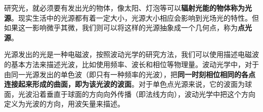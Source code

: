 
研究光，就必须要有发出光的物体，像太阳、灯泡等可以\textbf{辐射光能的物体称为光源}。现实生活中的光源都有着一定大小，光源大小相应会影响到光场光的特性。但如果这一影响微乎其微，我们则可以将这样的光源抽象成一个几何点，称为\textbf{点光源}。

光源发出的光是一种电磁波，按照波动光学的研究方法，我们可以使用描述电磁波的基本方法来描述光波，比如使用频率、波长和相位等物理量。波动光学中，对于由同一光源发出的单色波（即只有一种频率的光波），把\textbf{同一时刻相位相同的各点连接起来形成的曲面，即为该光波的波面}。对于单色点光源来说，它的波面为球面，光波沿着垂直于球面的方向向外传播（即法线方向），波动光学中把这个方向定义为光波的方向，用波矢量来描述。


